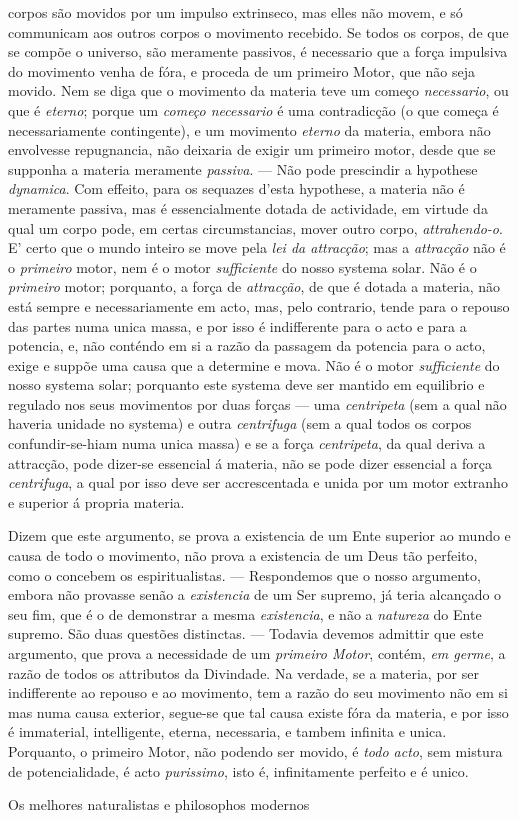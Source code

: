 corpos são movidos por um impulso extrinseco, mas elles não movem, e só communicam aos outros corpos o movimento recebido. Se todos os corpos, de que se compõe o universo, são meramente passivos, é necessario que a força impulsiva do movimento venha de fóra, e proceda de um primeiro Motor, que não seja movido. Nem se diga que o movimento da materia teve um começo \emph{necessario}, ou que é \emph{eterno}; porque um \emph{começo necessario} é uma contradicção (o que começa é necessariamente contingente), e um movimento \emph{eterno} da materia, embora não envolvesse repugnancia, não deixaria de exigir um primeiro motor, desde que se supponha a materia meramente \emph{passiva}. --- Não pode prescindir a hypothese \emph{dynamica}. Com effeito, para os sequazes d'esta hypothese, a materia não é meramente passiva, mas é essencialmente dotada de actividade, em virtude da qual um corpo pode, em certas circumstancias, mover outro corpo, \emph{attrahendo-o}. E' certo que o mundo inteiro se move pela \emph{lei da attracção}; mas a \emph{attracção} não é o \emph{primeiro} motor, nem é o motor \emph{sufficiente} do nosso systema solar. Não é o \emph{primeiro} motor; porquanto, a força de \emph{attracção}, de que é dotada a materia, não está sempre e necessariamente em acto, mas, pelo contrario, tende para o repouso das partes numa unica massa, e por isso é indifferente para o acto e para a potencia, e, não conténdo em si a razão da passagem da potencia para o acto, exige e suppõe uma causa que a determine e mova. Não é o motor \emph{sufficiente} do nosso systema solar; porquanto este systema deve ser mantido em equilibrio e regulado nos seus movimentos por duas forças --- uma \emph{centripeta} (sem a qual não haveria unidade no systema) e outra \emph{centrifuga} (sem a qual todos os corpos confundir-se-hiam numa unica massa) e se a força \emph{centripeta}, da qual deriva a attracção, pode dizer-se essencial á materia, não se pode dizer essencial a força \emph{centrifuga}, a qual por isso deve ser accrescentada e unida por um motor extranho e superior á propria materia.\par Dizem que este argumento, se prova a existencia de um Ente superior ao mundo e causa de todo o movimento, não prova a existencia de um Deus tão perfeito, como o concebem os espiritualistas. --- Respondemos que o nosso argumento, embora não provasse senão a \emph{existencia} de um Ser supremo, já teria alcançado o seu fim, que é o de demonstrar a mesma \emph{existencia}, e não a \emph{natureza} do Ente supremo. São duas questões distinctas. --- Todavia devemos admittir que este argumento, que prova a necessidade de um \emph{primeiro Motor}, contém, \emph{em germe}, a razão de todos os attributos da Divindade. Na verdade, se a materia, por ser indifferente ao repouso e ao movimento, tem a razão do seu movimento não em si mas numa causa exterior, segue-se que tal causa existe fóra da materia, e por isso é immaterial, intelligente, eterna, necessaria, e tambem infinita e unica. Porquanto, o primeiro Motor, não podendo ser movido, é \emph{todo acto}, sem mistura de potencialidade, é acto \emph{purissimo}, isto é, infinitamente perfeito e é unico.\par Os melhores naturalistas e philosophos modernos 